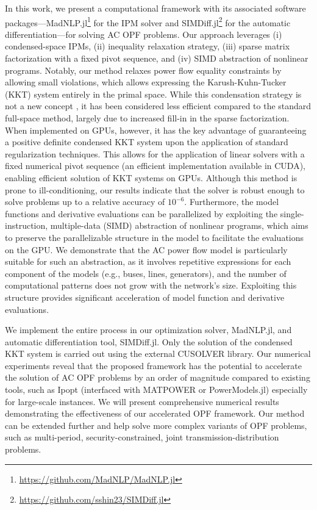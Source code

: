 In this work, we present a computational framework with its associated software packages—MadNLP.jl\footnote{\url{https://github.com/MadNLP/MadNLP.jl}} for the IPM solver and SIMDiff.jl\footnote{\url{https://github.com/sshin23/SIMDiff.jl}} for the automatic differentiation—for solving AC OPF problems. Our approach leverages (i) condensed-space IPMs, (ii) inequality relaxation strategy, (iii) sparse matrix factorization with a fixed pivot sequence, and (iv) SIMD abstraction of nonlinear programs. Notably, our method relaxes power flow equality constraints by allowing small violations, which allows expressing the Karush-Kuhn-Tucker (KKT) system entirely in the primal space. While this condensation strategy is not a new concept \cite{nocedal2006numerical}, it has been considered less efficient compared to the standard full-space method, largely due to increased fill-in in the sparse factorization. When implemented on GPUs, however, it has the key advantage of guaranteeing a positive definite condensed KKT system upon the application of standard regularization techniques. This allows for the application of linear solvers with a fixed numerical pivot sequence (an efficient implementation available in CUDA), enabling efficient solution of KKT systems on GPUs. Although this method is prone to ill-conditioning, our results indicate that the solver is robust enough to solve problems up to a relative accuracy of $10^{-6}$. Furthermore, the model functions and derivative evaluations can be parallelized by exploiting the single-instruction, multiple-data (SIMD) abstraction of nonlinear programs, which aims to preserve the parallelizable structure in the model to facilitate the evaluations on the GPU. We demonstrate that the AC power flow model is particularly suitable for such an abstraction, as it involves repetitive expressions for each component of the models (e.g., buses, lines, generators), and the number of computational patterns does not grow with the network's size. Exploiting this structure provides significant acceleration of model function and derivative evaluations.

We implement the entire process in our optimization solver, MadNLP.jl, and automatic differentiation tool, SIMDiff.jl. Only the solution of the condensed KKT system is carried out using the external CUSOLVER library. Our numerical experiments reveal that the proposed framework has the potential to accelerate the solution of AC OPF problems by an order of magnitude compared to existing tools, such as Ipopt (interfaced with MATPOWER or PowerModels.jl) especially for large-scale instances. We will present comprehensive numerical results demonstrating the effectiveness of our accelerated OPF framework. Our method can be extended further and help solve more complex variants of OPF problems, such as multi-period, security-constrained, joint transmission-distribution problems.






